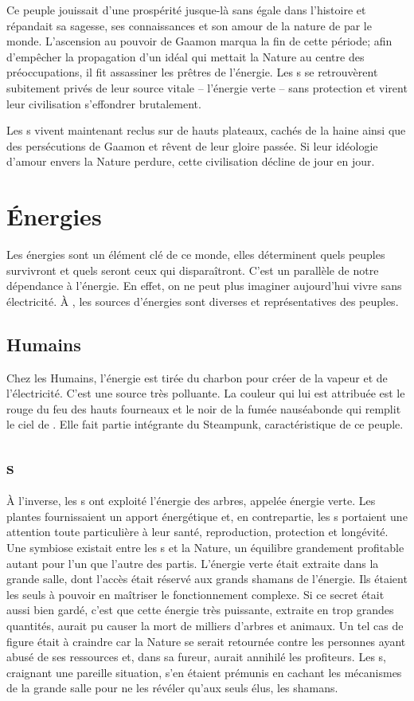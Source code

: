 Ce peuple jouissait d'une prospérité jusque-là sans égale dans l'histoire et répandait sa sagesse, ses connaissances et son amour de la nature de par le monde. L'ascension au pouvoir de Gaamon marqua la fin de cette période; afin d'empêcher la propagation d'un idéal qui mettait la Nature au centre des préoccupations, il fit assassiner les prêtres de l'énergie. Les \nomNaturels s se retrouvèrent subitement privés de leur source vitale -- l'énergie verte -- sans protection et virent leur civilisation s'effondrer brutalement.

Les \nomNaturels s vivent maintenant reclus sur de hauts plateaux, cachés de la haine ainsi que des persécutions de Gaamon et rêvent de leur gloire passée. Si leur idéologie d'amour envers la Nature perdure, cette civilisation décline de jour en jour.



\section{Énergies}
\label{sec:energies}
Les énergies sont un élément clé de ce monde, elles déterminent quels peuples survivront et quels seront ceux qui disparaîtront. C'est un parallèle de notre dépendance à l'énergie. En effet, on ne peut plus imaginer aujourd'hui vivre sans électricité. À \nomUnivers, les sources d'énergies sont diverses et représentatives des peuples.

\subsection{Humains}
Chez les Humains, l'énergie est tirée du charbon pour créer de la vapeur et de l'électricité. C'est une source très polluante. La couleur qui lui est attribuée est le rouge du feu des hauts fourneaux et le noir de la fumée nauséabonde qui remplit le ciel de \nomVille. Elle fait partie intégrante du Steampunk, caractéristique de ce peuple.

\subsection{\nomNaturels s}
À l'inverse, les \nomNaturels s ont exploité l'énergie des arbres, appelée énergie verte. Les plantes fournissaient un apport énergétique et, en contrepartie, les \nomNaturels s portaient une attention toute particulière à leur santé, reproduction, protection et longévité. Une symbiose existait entre les \nomNaturels s et la Nature, un équilibre grandement profitable autant pour l'un que l'autre des partis. L'énergie verte était extraite dans la grande salle, dont l'accès était réservé aux grands shamans de l'énergie. Ils étaient les seuls à pouvoir en maîtriser le fonctionnement complexe. Si ce secret était aussi bien gardé, c'est que cette énergie très puissante, extraite en trop grandes quantités, aurait pu causer la mort de milliers d'arbres et animaux. Un tel cas de figure était à craindre car la Nature se serait retournée contre les personnes ayant abusé de ses ressources et, dans sa fureur, aurait annihilé les profiteurs. Les \nomNaturels s, craignant une pareille situation, s'en étaient prémunis en cachant les mécanismes de la grande salle pour ne les révéler qu'aux seuls élus, les shamans.

